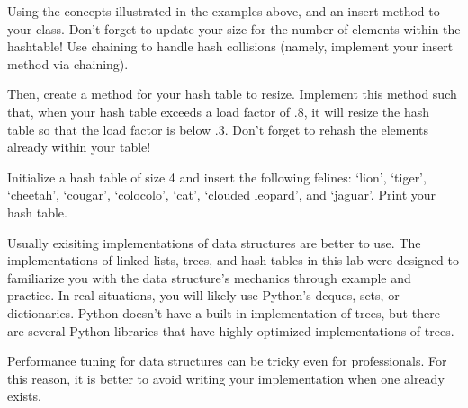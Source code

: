\begin{problem}
Using the concepts illustrated in the examples above, and an insert method to your  class. 
Don't forget to update your size for the number of elements within the hashtable!
Use chaining to handle hash collisions (namely, implement your insert method via chaining).

Then, create a method for your hash table to resize. 
Implement this method such that, when your hash table exceeds a load factor of $.8$, it will resize the hash table so that the load factor is below $.3$.
Don't forget to rehash the elements already within your table!

Initialize a hash table of size 4 and insert the following felines: `lion', `tiger', `cheetah', `cougar', `colocolo', `cat', `clouded leopard', and `jaguar'.
Print your hash table.
\label{prob:hash_table}
\end{problem}

\begin{info}
Usually exisiting implementations of data structures are better to use.
The implementations of linked lists, trees, and hash tables in this lab were designed to familiarize you with the data structure's mechanics through example and practice.
In real situations, you will likely use Python's deques, sets, or dictionaries.
Python doesn't have a built-in implementation of trees, but there are several Python libraries that have highly optimized implementations of trees.

Performance tuning for data structures can be tricky even for professionals.
For this reason, it is better to avoid writing your implementation when one already exists.
\end{info}

